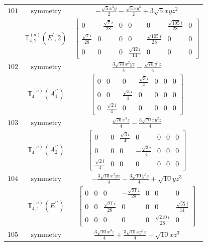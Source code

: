 \documentclass[fleqn,8pt,landscape]{jsarticle}
\begin{document}
\begin{longtable}{ccc}
$ 101 $ & $ \text{symmetry} $ & $ - \frac{\sqrt{5} x^{3} y}{2} - \frac{\sqrt{5} x y^{3}}{2} + 3 \sqrt{5} x y z^{2} $ \\
$  $ & $ \mathbb{T}_{4,2}^{(a)}(E^{\prime},2) $ & $ \begin{bmatrix} 0 & - \frac{\sqrt{7} i}{28} & 0 & 0 & 0 & \frac{\sqrt{105} i}{28} & 0 \\ \frac{\sqrt{7} i}{28} & 0 & 0 & 0 & \frac{\sqrt{105} i}{28} & 0 & 0 \\ 0 & 0 & 0 & \frac{\sqrt{42} i}{14} & 0 & 0 & 0 \end{bmatrix} $ \\ \hline
$ 102 $ & $ \text{symmetry} $ & $ \frac{3 \sqrt{70} x^{2} y z}{4} - \frac{\sqrt{70} y^{3} z}{4} $ \\
$  $ & $ \mathbb{T}_{4}^{(a)}(A_{1}^{\prime\prime}) $ & $ \begin{bmatrix} 0 & 0 & 0 & \frac{\sqrt{3} i}{4} & 0 & 0 & 0 \\ 0 & 0 & \frac{\sqrt{3} i}{4} & 0 & 0 & 0 & 0 \\ 0 & \frac{\sqrt{2} i}{4} & 0 & 0 & 0 & 0 & 0 \end{bmatrix} $ \\ \hline
$ 103 $ & $ \text{symmetry} $ & $ \frac{\sqrt{70} x^{3} z}{4} - \frac{3 \sqrt{70} x y^{2} z}{4} $ \\
$  $ & $ \mathbb{T}_{4}^{(a)}(A_{2}^{\prime\prime}) $ & $ \begin{bmatrix} 0 & 0 & \frac{\sqrt{3} i}{4} & 0 & 0 & 0 & 0 \\ 0 & 0 & 0 & - \frac{\sqrt{3} i}{4} & 0 & 0 & 0 \\ \frac{\sqrt{2} i}{4} & 0 & 0 & 0 & 0 & 0 & 0 \end{bmatrix} $ \\ \hline
$ 104 $ & $ \text{symmetry} $ & $ - \frac{3 \sqrt{10} x^{2} y z}{4} - \frac{3 \sqrt{10} y^{3} z}{4} + \sqrt{10} y z^{3} $ \\
$  $ & $ \mathbb{T}_{4,1}^{(a)}(E^{\prime\prime}) $ & $ \begin{bmatrix} 0 & 0 & 0 & - \frac{\sqrt{21} i}{28} & 0 & 0 & 0 \\ 0 & 0 & \frac{\sqrt{21} i}{28} & 0 & 0 & 0 & \frac{\sqrt{35} i}{14} \\ 0 & 0 & 0 & 0 & 0 & \frac{\sqrt{210} i}{28} & 0 \end{bmatrix} $ \\ \hline
$ 105 $ & $ \text{symmetry} $ & $ \frac{3 \sqrt{10} x^{3} z}{4} + \frac{3 \sqrt{10} x y^{2} z}{4} - \sqrt{10} x z^{3} $ \\

\end{longtable}
\end{document}
